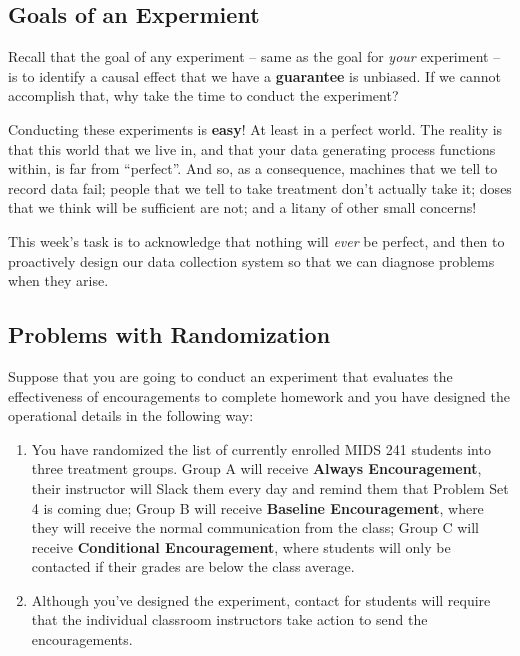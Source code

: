 \documentclass[
]{article}
\providecommand{\tightlist}{%
  \setlength{\itemsep}{0pt}\setlength{\parskip}{0pt}}
\theoremstyle{definition}
\theoremstyle{definition}
\theoremstyle{definition}
\theoremstyle{definition}
\theoremstyle{remark}
\begin{document}
\subsection{Goals of an Expermient}\label{goals-of-an-expermient}

Recall that the goal of any experiment -- same as the goal for \emph{your} experiment -- is to identify a causal effect that we have a \textbf{guarantee} is unbiased. If we cannot accomplish that, why take the time to conduct the experiment?

Conducting these experiments is \textbf{easy}! At least in a perfect world. The reality is that this world that we live in, and that your data generating process functions within, is far from ``perfect''. And so, as a consequence, machines that we tell to record data fail; people that we tell to take treatment don't actually take it; doses that we think will be sufficient are not; and a litany of other small concerns!

This week's task is to acknowledge that nothing will \emph{ever} be perfect, and then to proactively design our data collection system so that we can diagnose problems when they arise.

\subsection{Problems with Randomization}\label{problems-with-randomization}

Suppose that you are going to conduct an experiment that evaluates the effectiveness of encouragements to complete homework and you have designed the operational details in the following way:

\begin{enumerate}
\def\labelenumi{\arabic{enumi}.}
\tightlist
\item
  You have randomized the list of currently enrolled MIDS 241 students into three treatment groups. Group A will receive \textbf{Always Encouragement}, their instructor will Slack them every day and remind them that Problem Set 4 is coming due; Group B will receive \textbf{Baseline Encouragement}, where they will receive the normal communication from the class; Group C will receive \textbf{Conditional Encouragement}, where students will only be contacted if their grades are below the class average.
\item
  Although you've designed the experiment, contact for students will require that the individual classroom instructors take action to send the encouragements.
\end{enumerate}
\end{document}

